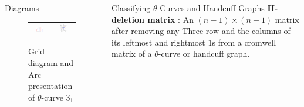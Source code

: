 \documentclass[final]{beamer}
\begin{document}
\begin{frame}[t]
\begin{columns}[t]
\begin{block}{Diagrams}
    \begin{figure}[h]
      \centering
      \begin{tabular}{cc}
        \includegraphics[width=0.45\textwidth]{figure/grid.png} &
        \includegraphics[width=0.45\textwidth]{figure/openbook.png} \\
      \end{tabular}        
      \caption{Grid diagram and Arc presentation of $\theta$-curve $3_1$}
    \end{figure}
  \end{block}
    


  \begin{block}{Classifying $\theta$-Curves and Handcuff Graphs}
  \textbf{H-deletion matrix} : An $(n{-}1)\times(n{-}1)$ matrix after removing any Three-row and the columns of its leftmost and rightmost $1$s from a cromwell matrix of a $\theta$-curve or handcuff graph. 

  \vspace{0.33em}
  

\end{block}
\end{columns}
\end{frame}
\end{document}
